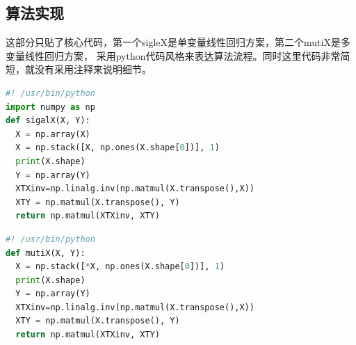 \documentclass{ctexart}
\begin{document}
\subsection{算法实现}
\begin{info} %
	这部分只贴了核心代码，第一个sigleX是单变量线性回归方案，第二个mutiX是多变量线性回归方案，
	采用python代码风格来表达算法流程。同时这里代码非常简短，就没有采用注释来说明细节。
\end{info}
\begin{file}[sigleX.py]
	\begin{lstlisting}[language=Python]
#! /usr/bin/python	
import numpy as np
def sigalX(X, Y):
  X = np.array(X)
  X = np.stack([X, np.ones(X.shape[0])], 1)
  print(X.shape)
  Y = np.array(Y)
  XTXinv=np.linalg.inv(np.matmul(X.transpose(),X))
  XTY = np.matmul(X.transpose(), Y)
  return np.matmul(XTXinv, XTY)
	\end{lstlisting}
\end{file}
\begin{file}[mutiX.py]
	\begin{lstlisting}[language=Python]
#! /usr/bin/python
def mutiX(X, Y):
  X = np.stack([*X, np.ones(X.shape[0])], 1)
  print(X.shape)
  Y = np.array(Y)
  XTXinv=np.linalg.inv(np.matmul(X.transpose(),X))
  XTY = np.matmul(X.transpose(), Y)
  return np.matmul(XTXinv, XTY)
	\end{lstlisting}
\end{file}
\end{document}
